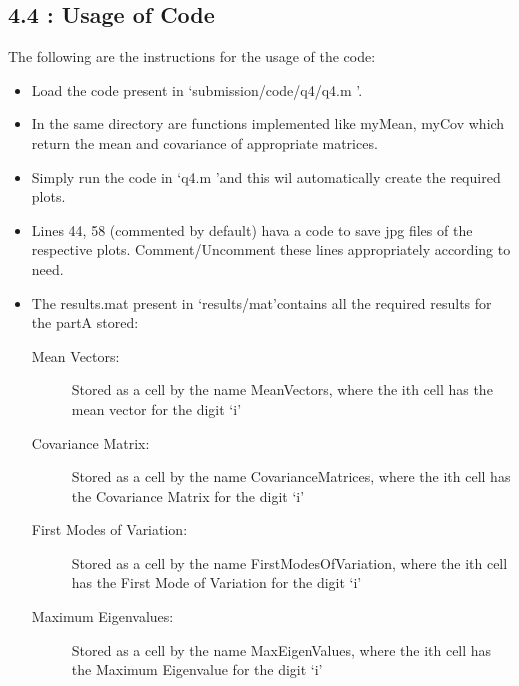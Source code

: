 \documentclass[12pt, a4paper]{article}
\begin{document}
 \newpage
\subsection*{4.4 : Usage of Code}
The following are the instructions for the usage of the code:
\begin{itemize}
\item Load the code present in \lq submission/code/q4/q4.m \rq \space.
\item In the same directory are functions implemented like myMean, myCov which return the mean and covariance of appropriate matrices.
\item Simply run the code in \lq q4.m \rq \space and this wil automatically create the required plots.
\item Lines 44, 58 (commented by default) hava a code to save jpg files of the respective plots. Comment/Uncomment these lines appropriately according to need.
\item The results.mat present in \lq results/mat\rq \space contains all the required results for the partA stored: 
	\begin{description}
	\item[Mean Vectors:] Stored as a cell by the name MeanVectors, where the ith cell has the mean vector for the digit \lq i\rq
	\item[Covariance Matrix:] Stored as a cell by the name CovarianceMatrices, where the ith cell has the Covariance Matrix for the digit \lq i\rq
	\item[First Modes of Variation:] Stored as a cell by the name FirstModesOfVariation, where the ith cell has the First Mode of Variation for the digit \lq i\rq
	\item[Maximum Eigenvalues:] Stored as a cell by the name MaxEigenValues, where the ith cell has the Maximum Eigenvalue for the digit \lq i\rq
	\end{description}

\end{itemize}
 
 
\end{document}
